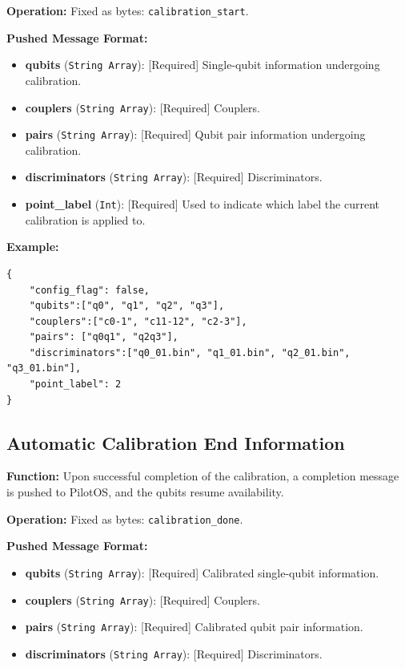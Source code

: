 \documentclass[12pt, a4paper]{article}
\begin{document}
\textbf{Operation:} Fixed as bytes: \texttt{calibration\_start}.

\textbf{Pushed Message Format:}
\begin{itemize}
    \item \textbf{qubits} (\texttt{String Array}): [Required] Single-qubit information undergoing calibration.
    \item \textbf{couplers} (\texttt{String Array}): [Required] Couplers.
    \item \textbf{pairs} (\texttt{String Array}): [Required] Qubit pair information undergoing calibration.
    \item \textbf{discriminators} (\texttt{String Array}): [Required] Discriminators.
    \item \textbf{point\_label} (\texttt{Int}): [Required] Used to indicate which label the current calibration is applied to.
\end{itemize}

\noindent \textbf{Example:}
\begin{lstlisting}
{
    "config_flag": false,
    "qubits":["q0", "q1", "q2", "q3"],
    "couplers":["c0-1", "c11-12", "c2-3"],
    "pairs": ["q0q1", "q2q3"],
    "discriminators":["q0_01.bin", "q1_01.bin", "q2_01.bin", "q3_01.bin"],
    "point_label": 2
}
\end{lstlisting}

\subsection{Automatic Calibration End Information}

\textbf{Function:} Upon successful completion of the calibration, a completion message is pushed to PilotOS, and the qubits resume availability.

\textbf{Operation:} Fixed as bytes: \texttt{calibration\_done}.

\textbf{Pushed Message Format:}
\begin{itemize}
    \item \textbf{qubits} (\texttt{String Array}): [Required] Calibrated single-qubit information.
    \item \textbf{couplers} (\texttt{String Array}): [Required] Couplers.
    \item \textbf{pairs} (\texttt{String Array}): [Required] Calibrated qubit pair information.
    \item \textbf{discriminators} (\texttt{String Array}): [Required] Discriminators.
\end{itemize}
\end{document}

